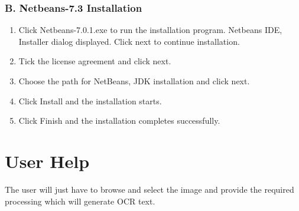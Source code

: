 \subsubsection{B. Netbeans-7.3 Installation}
\begin{enumerate}
\item Click Netbeans-7.0.1.exe to run the installation program. Netbeans IDE, Installer  dialog displayed. Click next to continue installation.
\item Tick the license agreement and click next.
\item Choose the path for NetBeans, JDK installation and click next.
\item Click Install and the installation starts.
\item Click Finish and the installation completes successfully.
\end{enumerate}
\paragraph{}
\section{User Help}
The user will just have to browse and select the image and provide the required processing which will generate OCR text.\\